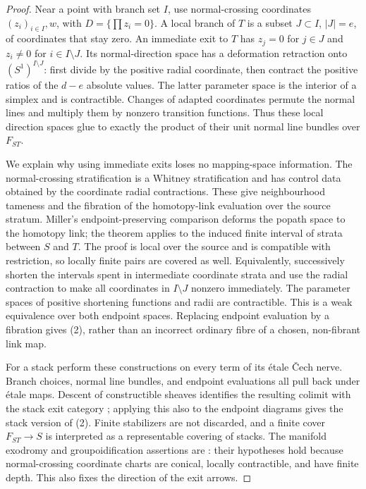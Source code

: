 \begin{proof}
Near a point with branch set $I$, use normal-crossing coordinates
$(z_i)_{i\in I},w$, with $D=\{\prod z_i=0\}$.  A local branch of $T$ is a
subset $J\subset I$, $|J|=e$, of coordinates that stay zero.  An immediate
exit to $T$ has $z_j=0$ for $j\in J$ and $z_i\ne0$ for $i\in I\setminus J$.
Its normal-direction space has a deformation retraction onto
$(S^1)^{I\setminus J}$: first divide by the positive radial coordinate, then
contract the positive ratios of the $d-e$ absolute values.  The latter
parameter space is the interior of a simplex and is contractible.  Changes
of adapted coordinates permute the normal lines and multiply them by
nonzero transition functions.  Thus these local direction spaces glue to
exactly the product of their unit normal line bundles over $F_{ST}$.

We explain why using immediate exits loses no mapping-space information.
The normal-crossing stratification is a Whitney stratification and has
control data obtained by the coordinate radial contractions.  These give
neighbourhood tameness and the fibration of the homotopy-link evaluation
over the source stratum.  Miller's endpoint-preserving comparison
\citep[Theorem 4.9]{Miller2009} deforms the popath space to the homotopy
link; the theorem applies to the induced finite interval of strata between
$S$ and $T$.  The proof is local over the source and is compatible with
restriction, so locally finite pairs are covered as well.  Equivalently,
successively shorten the intervals spent in intermediate coordinate
strata and use the radial contraction to make all coordinates in
$I\setminus J$ nonzero immediately.  The parameter spaces of positive
shortening functions and radii are contractible.  This is a weak
equivalence over both endpoint spaces.  Replacing endpoint evaluation by
a fibration gives (2), rather than an incorrect ordinary fibre of a
chosen, non-fibrant link map.

For a stack perform these constructions on every term of its étale Čech
nerve.  Branch choices, normal line bundles, and endpoint evaluations all
pull back under étale maps.  Descent of constructible sheaves identifies
the resulting colimit with the stack exit category
\citep[Proposition 3.16 and Corollary 3.17]{JansenToolbox2024}; applying this also to the
endpoint diagrams gives the stack version of (2).  Finite stabilizers
are not discarded, and a finite cover $F_{ST}\to S$ is interpreted as a
representable covering of stacks.  The manifold exodromy and
groupoidification assertions are
\citet[Theorem A.9.3 and Corollary A.9.4]{LurieHA2017}: their hypotheses
hold because normal-crossing coordinate charts are conical, locally
contractible, and have finite depth.  This also fixes the direction of
the exit arrows.
\end{proof}


